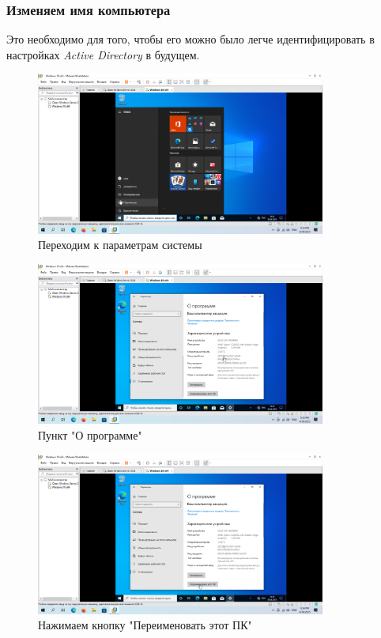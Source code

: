 \documentclass[a4paper]{article}
\begin{document}
  \subsubsection{Изменяем имя компьютера}

  Это необходимо для того, чтобы его можно было легче идентифицировать в настройках \textit{Active Directory} в будущем.

  \begin{figure}[H]
    \centering
    \includegraphics[width=0.85\textwidth]{Screenshot_92}
    \caption{Переходим к параметрам системы}
    \label{img:92}
  \end{figure}

  \begin{figure}[H]
    \centering
    \includegraphics[width=0.85\textwidth]{Screenshot_93}
    \caption{Пункт "О программе"}
    \label{img:93}
  \end{figure}

  \begin{figure}[H]
    \centering
    \includegraphics[width=0.85\textwidth]{Screenshot_94}
    \caption{Нажимаем кнопку "Переименовать этот ПК"}
    \label{img:94}
  \end{figure}
\end{document}
